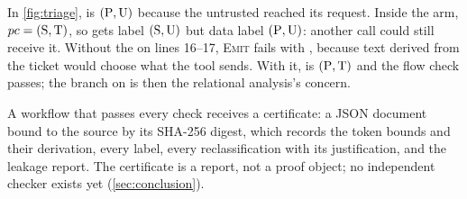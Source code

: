 \begin{example}\label{ex:triage-labels}
In \cref{fig:triage},  is $(\mathrm{P},\mathrm{U})$ because the untrusted
 reached its request. Inside the arm, $pc = (\mathrm{S},\mathrm{T})$, so
 gets label $(\mathrm{S},\mathrm{U})$ but data label $(\mathrm{P},\mathrm{U})$: another
call could still receive it. Without the  on lines 16--17,
\textsc{Emit} fails with , because text derived from the ticket would
choose what the tool sends. With it,  is $(\mathrm{P},\mathrm{T})$ and the flow
check passes; the branch on  is then the relational analysis's
concern.
\end{example}

A workflow that passes every check receives a certificate: a JSON document bound to
the source by its SHA-256 digest, which records the token bounds and their
derivation, every label, every reclassification with its justification, and the
leakage report. The certificate is a report, not a proof object; no independent
checker exists yet (\cref{sec:conclusion}).

